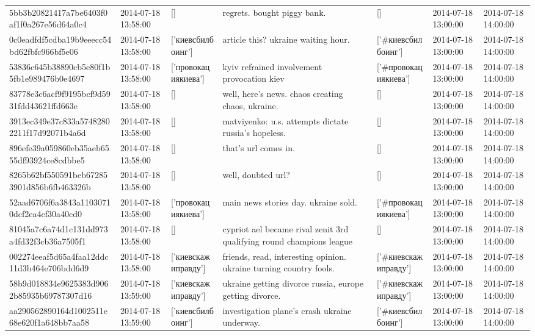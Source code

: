 \begin{tabular}{lllllll}
5bb3b20821417a7be6403f0af1f0a267e56d64a0c4 & 2014-07-18 13:58:00 & [] & regrets. bought piggy bank. & [] & 2014-07-18 13:00:00 & 2014-07-18 14:00:00 \\
0c0eadfdf5cdba19b9eeecc54bd62fbfc966bf5e06 & 2014-07-18 13:58:00 & ['киевсбилбоинг'] & article this? ukraine waiting hour. & ['#киевсбилбоинг'] & 2014-07-18 13:00:00 & 2014-07-18 14:00:00 \\
53836c645b38890cb5e80f1b5fb1e989476b0e4697 & 2014-07-18 13:58:00 & ['провокациякиева'] & kyiv refrained involvement provocation kiev & ['#провокациякиева'] & 2014-07-18 13:00:00 & 2014-07-18 14:00:00 \\
83778e3c6acf9f9195bcf9d5931fdd43621ffd663e & 2014-07-18 13:58:00 & [] & well, here's news. chaos creating chaos, ukraine. & [] & 2014-07-18 13:00:00 & 2014-07-18 14:00:00 \\
3913ec349e37c833a57482802211f17d92071b4a6d & 2014-07-18 13:58:00 & [] & matviyenko: u.s. attempts dictate russia's hopeless. & [] & 2014-07-18 13:00:00 & 2014-07-18 14:00:00 \\
896efe39a059860eb35aeb6555df93924ce8cdbbe5 & 2014-07-18 13:58:00 & [] & that's url comes in. & [] & 2014-07-18 13:00:00 & 2014-07-18 14:00:00 \\
8265b62bf550591beb672853901d856b6fb463326b & 2014-07-18 13:58:00 & [] & well, doubted url? & [] & 2014-07-18 13:00:00 & 2014-07-18 14:00:00 \\
52aad6706f6a3843a11030710dcf2ea4cf30a40cd0 & 2014-07-18 13:58:00 & ['провокациякиева'] & main news stories day. ukraine sold. & ['#провокациякиева'] & 2014-07-18 13:00:00 & 2014-07-18 14:00:00 \\
81045a7c6a74d1c131dd973a4fd32f3cb36a7505f1 & 2014-07-18 13:58:00 & [] & cypriot ael became rival zenit 3rd qualifying round champions league & [] & 2014-07-18 13:00:00 & 2014-07-18 14:00:00 \\
002274eeaf5d65a4faa12ddc11d3b464e706bdd6d9 & 2014-07-18 13:58:00 & ['киевскажиправду'] & friends, read, interesting opinion. ukraine turning country fools. & ['#киевскажиправду'] & 2014-07-18 13:00:00 & 2014-07-18 14:00:00 \\
58b9d018834e9625383d9062b85935b69787307d16 & 2014-07-18 13:59:00 & ['киевскажиправду'] & ukraine getting divorce russia, europe getting divorce. & ['#киевскажиправду'] & 2014-07-18 13:00:00 & 2014-07-18 14:00:00 \\
aa290562890164d1002511e68e620f1a648bb7aa58 & 2014-07-18 13:59:00 & ['киевсбилбоинг'] & investigation plane's crash ukraine underway. & ['#киевсбилбоинг'] & 2014-07-18 13:00:00 & 2014-07-18 14:00:00 \\

\end{tabular}
